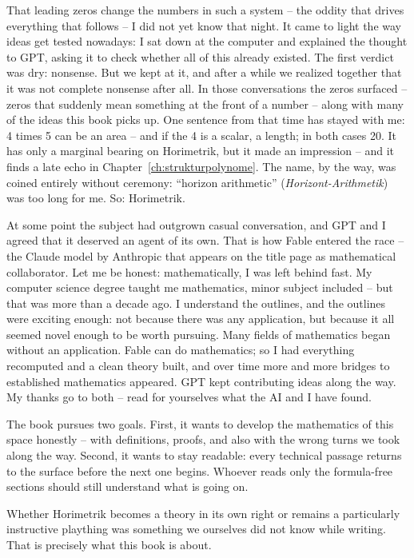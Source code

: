 That leading zeros change the numbers in such a system -- the
oddity that drives everything that follows -- I did not yet know
that night. It came to light the way ideas get tested nowadays: I
sat down at the computer and explained the thought to GPT, asking
it to check whether all of this already existed. The first verdict
was dry: nonsense. But we kept at it, and after a while we realized
together that it was not complete nonsense after all. In those
conversations the zeros surfaced -- zeros that suddenly mean
something at the front of a number -- along with many of the ideas
this book picks up. One sentence from that time has stayed with me:
4 times 5 can be an area -- and if the 4 is a scalar, a length; in
both cases 20. It has only a marginal bearing on Horimetrik, but it
made an impression -- and it finds a late echo in
Chapter~\ref{ch:strukturpolynome}. The name, by the way, was coined
entirely without ceremony: ``horizon arithmetic''
(\emph{Horizont-Arithmetik}) was too long for me. So: Horimetrik.

At some point the subject had outgrown casual conversation, and GPT
and I agreed that it deserved an agent of its own. That is how
Fable entered the race -- the Claude model by Anthropic that
appears on the title page as mathematical collaborator. Let me be
honest: mathematically, I was left behind fast. My computer science
degree taught me mathematics, minor subject included -- but that
was more than a decade ago. I understand the outlines, and the
outlines were exciting enough: not because there was any
application, but because it all seemed novel enough to be worth
pursuing. Many fields of mathematics began without an application.
Fable can do mathematics; so I had everything recomputed and a
clean theory built, and over time more and more bridges to
established mathematics appeared. GPT kept contributing ideas along
the way. My thanks go to both -- read for yourselves what the AI
and I have found.

The book pursues two goals. First, it wants to develop the
mathematics of this space honestly -- with definitions, proofs, and
also with the wrong turns we took along the way. Second, it wants
to stay readable: every technical passage returns to the surface
before the next one begins. Whoever reads only the formula-free
sections should still understand what is going on.

Whether Horimetrik becomes a theory in its own right or remains a
particularly instructive plaything was something we ourselves did
not know while writing. That is precisely what this book is about.
